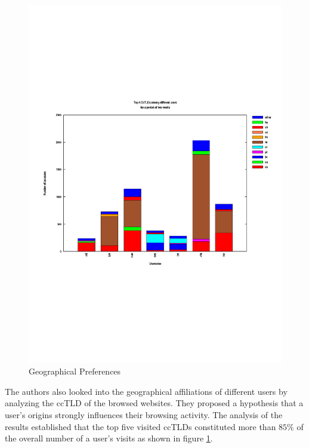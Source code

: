 \begin{figure}[h!]
\begin{center}
  \includegraphics* [width=0.60\linewidth]{figures/cybermetrics-geography}
  \caption{Geographical Preferences \cite{nmelnikov:thesis:2010}}
  \label{fig:cybermetrics-geography}
\end{center}
\end{figure}
The authors also looked into the geographical affiliations of different users by analyzing the \ac{ccTLD} of the browsed websites. They proposed a hypothesis that a user's origins strongly  influences their browsing activity. The analysis of the results established that the top five visited \ac{ccTLD}s constituted more than $85\%$ of the overall number of a user's visits as shown in figure \ref{fig:cybermetrics-geography}.

